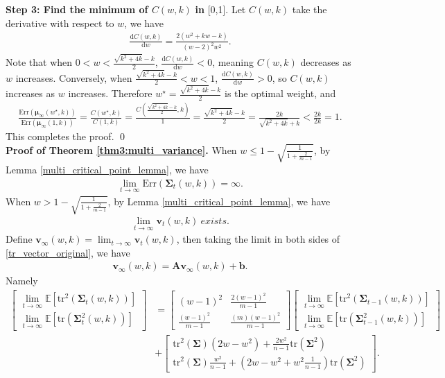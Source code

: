\noindent
\textbf{Step 3: Find the minimum of $C(w,k)$} \textbf{in} [0,1]. Let $C(w,k)$ take the derivative with respect to $w$, we have
\begin{align}
\label{derivate_Cw}
\frac{\mathrm{d}C(w,k)}{\mathrm{d}w}=\frac{2 \left(w^{2} + kw - k\right)}{\left(w - 2\right)^{2} w^{2}}.
\end{align}
Note that when $0 < w < \frac{\sqrt{k^{2} + 4k} - k}{2}$, $\frac{\mathrm{d}C(w,k)}{\mathrm{d}w} < 0$, meaning $C(w,k)$ decreases as $w$ increases. Conversely, when $\frac{\sqrt{k^{2} + 4k} - k}{2} < w < 1$, $\frac{\mathrm{d}C(w,k)}{\mathrm{d}w} > 0$, so $C(w,k)$ increases as $w$ increases. Therefore $w^{\star}=\frac{\sqrt{k^{2} + 4k} - k}{2}$ is the optimal weight, and 
\begin{align}
\frac{\mathrm{Err}(\bm{\mu}_{\infty}(w^\star,k))}{\mathrm{Err}(\bm{\mu}_{\infty}(1,k))} = \frac{C(w^{\star}, k)}{C(1,k)}=\frac{C\left(\frac{\sqrt{k^{2} + 4k} - k}{2},k\right)}{1}=\frac{\sqrt{k^2+4k}-k}{2}=\frac{2k}{\sqrt{k^2+4k}+k}<\frac{2k}{2k}=1.
\end{align}
This completes the proof. \qed \\
\noindent
\textbf{Proof of Theorem \ref{thm3:multi_variance}.} When $w\leq 1-\sqrt{\frac{1}{1+\frac{2}{m-1}}}$, by Lemma \ref{multi_critical_point_lemma}, we have
\begin{align*}
\lim_{t\to \infty}\mathrm{Err}(\mathbf{\Sigma}_{t}(w,k)) = \infty.
\end{align*}
When $w >1-\sqrt{\frac{1}{1+\frac{2}{m-1}}}$, by Lemma \ref{multi_critical_point_lemma}, we have
\begin{align*}
\lim_{t \to \infty} \bm{v}_t(w,k) \ \textit{exists}.
\end{align*}
Define $\bm{v}_{\infty}(w,k)=\lim_{t \to \infty} \bm{v}_t(w,k)$, then taking the limit in both sides of \eqref{tr_vector_original}, we have
\begin{align}
\bm{v}_{\infty}(w,k) = \mathbf{A} \bm{v}_{\infty}(w,k) + \bm{b}.
\end{align}
Namely
\begin{align*}
\begin{bmatrix}
\lim_{t \to \infty}\mathbb{E}[\mathrm{tr}^2(\bm \Sigma_t(w,k))] \\
\lim_{t \to \infty}\mathbb{E}[\mathrm{tr}(\bm \Sigma_t^2(w,k))]
\end{bmatrix}&=\begin{bmatrix}
(w - 1)^2 & \frac{2(w - 1)^2}{m - 1} \\
\frac{(w - 1)^2}{m - 1} & \frac{(m )(w - 1)^2}{m - 1}
\end{bmatrix}\begin{bmatrix}
\lim_{t \to \infty}\mathbb{E}[\mathrm{tr}^2(\bm \Sigma_{t-1}(w,k))] \\
\lim_{t \to \infty}\mathbb{E}[\mathrm{tr}(\bm \Sigma_{t-1}^2(w,k))]
\end{bmatrix}
\\ &+
\begin{bmatrix}
\mathrm{tr}^2(\bm{\Sigma})(2w-w^2)+\frac{2w^2}{n-1}\mathrm{tr}(\bm{\Sigma}^2) \\
\mathrm{tr}^2(\bm{\Sigma})\frac{w^2}{n-1}+(2w-w^2+w^2\frac{1}{n-1})\mathrm{tr}(\bm{\Sigma}^2)
\end{bmatrix}.
\end{align*}
